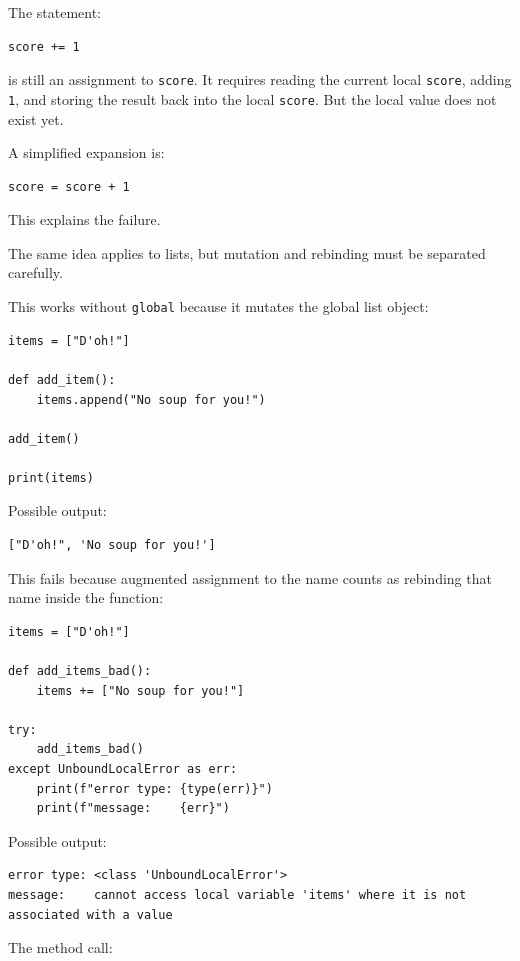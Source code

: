 The statement:

\begin{verbatim}
score += 1
\end{verbatim}

is still an assignment to \texttt{score}. It requires reading the current local \texttt{score}, adding \texttt{1}, and storing the result back into the local \texttt{score}. But the local value does not exist yet.

A simplified expansion is:

\begin{verbatim}
score = score + 1
\end{verbatim}

This explains the failure.

The same idea applies to lists, but mutation and rebinding must be separated carefully.

This works without \texttt{global} because it mutates the global list object:

\begin{verbatim}
items = ["D'oh!"]

def add_item():
    items.append("No soup for you!")

add_item()

print(items)
\end{verbatim}

Possible output:

\begin{verbatim}
["D'oh!", 'No soup for you!']
\end{verbatim}

This fails because augmented assignment to the name counts as rebinding that name inside the function:

\begin{verbatim}
items = ["D'oh!"]

def add_items_bad():
    items += ["No soup for you!"]

try:
    add_items_bad()
except UnboundLocalError as err:
    print(f"error type: {type(err)}")
    print(f"message:    {err}")
\end{verbatim}

Possible output:

\begin{verbatim}
error type: <class 'UnboundLocalError'>
message:    cannot access local variable 'items' where it is not associated with a value
\end{verbatim}

The method call:

